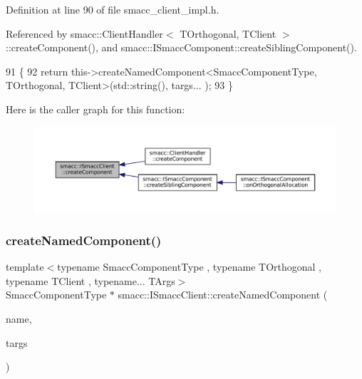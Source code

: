 Definition at line 90 of file smacc\+\_\+client\+\_\+impl.\+h.



Referenced by smacc\+::\+Client\+Handler$<$ T\+Orthogonal, T\+Client $>$\+::create\+Component(), and smacc\+::\+I\+Smacc\+Component\+::create\+Sibling\+Component().


\begin{DoxyCode}
91     \{
92         \textcolor{keywordflow}{return} this->createNamedComponent<SmaccComponentType, TOrthogonal, TClient>(std::string(), targs...
      );
93     \}
\end{DoxyCode}
Here is the caller graph for this function\+:
\nopagebreak
\begin{figure}[H]
\begin{center}
\leavevmode
\includegraphics[width=350pt]{classsmacc_1_1ISmaccClient_a5c1c8eb5e91a3b399662a52cb0ca86aa_icgraph}
\end{center}
\end{figure}
\mbox{\label{classsmacc_1_1ISmaccClient_affcc2f95bc993b5f07ef0d6ab6eec8f1}} 
\subsubsection{\texorpdfstring{create\+Named\+Component()}{createNamedComponent()}}
{\footnotesize\ttfamily template$<$typename Smacc\+Component\+Type , typename T\+Orthogonal , typename T\+Client , typename... T\+Args$>$ \\
Smacc\+Component\+Type $\ast$ smacc\+::\+I\+Smacc\+Client\+::create\+Named\+Component (\begin{DoxyParamCaption}\item[{std\+::string}]{name,  }\item[{T\+Args...}]{targs }\end{DoxyParamCaption})\hspace{0.3cm}{\ttfamily [protected]}}



